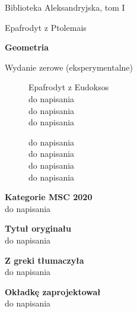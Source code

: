 \thispagestyle{empty}
{\noindent\fontsize{18pt}{18pt}\selectfont Biblioteka Aleksandryjska, tom I}

\noindent\makebox[\linewidth]{\rule{\textwidth}{1pt}}

\newpage

\thispagestyle{empty}
\phantom{nothing}
\newpage

\thispagestyle{empty}
{\noindent\fontsize{18pt}{18pt}\selectfont Epafrodyt z Ptolemais}

\noindent\makebox[\linewidth]{\rule{\textwidth}{1pt}}

\vspace{10mm}

{\noindent\fontsize{24pt}{24pt}\selectfont \textbf{Geometria}}
\vspace{10mm}

{\noindent\fontsize{14pt}{14pt}\selectfont Wydanie zerowe (eksperymentalne)}

\newpage

\thispagestyle{empty}
\begin{figure}[H]
\begin{minipage}[b]{.48\linewidth}
{\noindent Epafrodyt z Eudoksos\\
do napisania\\
do napisania\\
do napisania}
\end{minipage}
\begin{minipage}[b]{.48\linewidth}
{\noindent do napisania\\
do napisania\\
do napisania\\
do napisania}
\end{minipage}
\end{figure}

{\noindent \textbf{Kategorie MSC 2020}\\do napisania} \vspace{5mm}

{\noindent \textbf{Tytuł oryginału}\\do napisania} \vspace{5mm}

{\noindent \textbf{Z greki tłumaczyła}\\do napisania} \vspace{5mm}

{\noindent \textbf{Okładkę zaprojektował}\\do napisania} \vspace{5mm}

